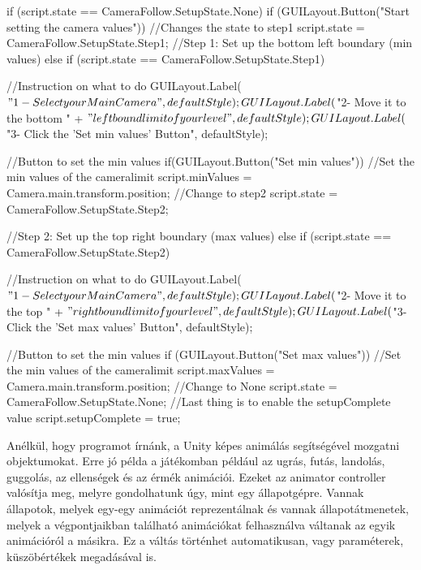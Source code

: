 \begin{java}
if (script.state == CameraFollow.SetupState.None)
{
    if (GUILayout.Button("Start setting the camera values"))
    {
        //Changes the state to step1
        script.state = CameraFollow.SetupState.Step1;
    }
}
//Step 1: Set up the bottom left boundary (min values)
else if (script.state == CameraFollow.SetupState.Step1)
{
    //Instruction on what to do
    GUILayout.Label($"1- Select your Main Camera",
        defaultStyle);
    GUILayout.Label($"2- Move it to the bottom " +
        $"left bound limit of your level", defaultStyle);
    GUILayout.Label($"3- Click the 'Set min values' Button", 
        defaultStyle);

    //Button to set the min values
    if(GUILayout.Button("Set min values"))
    {
        //Set the min values of the cameralimit
        script.minValues = Camera.main.transform.position;
        //Change to step2
        script.state = CameraFollow.SetupState.Step2;
    }
}
//Step 2: Set up the top right boundary (max values)
else if (script.state == CameraFollow.SetupState.Step2)
{
    //Instruction on what to do
    GUILayout.Label($"1- Select your Main Camera", 
        defaultStyle);
    GUILayout.Label($"2- Move it to the top " +
        $"right bound limit of your level", defaultStyle);
    GUILayout.Label($"3- Click the 'Set max values' Button", 
        defaultStyle);

    //Button to set the min values
    if (GUILayout.Button("Set max values"))
    {
        //Set the min values of the cameralimit
        script.maxValues = Camera.main.transform.position;
        //Change to None
        script.state = CameraFollow.SetupState.None;
        //Last thing is to enable the setupComplete value
        script.setupComplete = true;
    }
}
\end{java}


Anélkül, hogy programot írnánk, a Unity képes animálás segítségével mozgatni objektumokat. Erre jó példa a játékomban például az ugrás, futás, landolás, guggolás, az ellenségek és az érmék animációi. Ezeket az animator controller valósítja meg, melyre gondolhatunk úgy, mint egy állapotgépre\cite{animatorcomponent}. Vannak állapotok, melyek egy-egy animációt reprezentálnak és vannak állapotátmenetek, melyek a végpontjaikban található animációkat felhasználva váltanak az egyik animációról a másikra. Ez a váltás történhet automatikusan, vagy paraméterek, küszöbértékek megadásával is.

